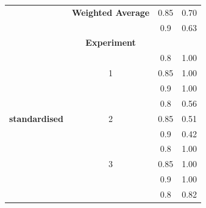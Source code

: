 \documentclass{mpaper}
\begin{document}
\begin{table}[]
\begin{tabular}{|c|ccc|}
                                                  & \multicolumn{1}{c|}{\textbf{Weighted Average}} & \multicolumn{1}{c|}{0.85}               & 0.70               \\
                                                  & \multicolumn{1}{c|}{}                          & \multicolumn{1}{c|}{0.9}                & 0.63               \\ \hline
\multirow{13}{*}{\textbf{standardised}}           & \multicolumn{1}{c|}{\textbf{Experiment}}       & \multicolumn{1}{c|}{}                   & \textbf{}          \\ \cline{2-4} 
                                                  & \multicolumn{1}{c|}{}                          & \multicolumn{1}{c|}{0.8}                & 1.00               \\
                                                  & \multicolumn{1}{c|}{1}                         & \multicolumn{1}{c|}{0.85}               & 1.00               \\
                                                  & \multicolumn{1}{c|}{}                          & \multicolumn{1}{c|}{0.9}                & 1.00               \\ \cline{2-4} 
                                                  & \multicolumn{1}{c|}{}                          & \multicolumn{1}{c|}{0.8}                & 0.56               \\
                                                  & \multicolumn{1}{c|}{2}                         & \multicolumn{1}{c|}{0.85}               & 0.51               \\
                                                  & \multicolumn{1}{c|}{}                          & \multicolumn{1}{c|}{0.9}                & 0.42               \\ \cline{2-4} 
                                                  & \multicolumn{1}{c|}{}                          & \multicolumn{1}{c|}{0.8}                & 1.00               \\
                                                  & \multicolumn{1}{c|}{3}                         & \multicolumn{1}{c|}{0.85}               & 1.00               \\
                                                  & \multicolumn{1}{c|}{}                          & \multicolumn{1}{c|}{0.9}                & 1.00               \\ \cline{2-4} 
                                                  & \multicolumn{1}{c|}{}                          & \multicolumn{1}{c|}{0.8}                & 0.82               \\

\end{tabular}
\end{table}
\end{document}
